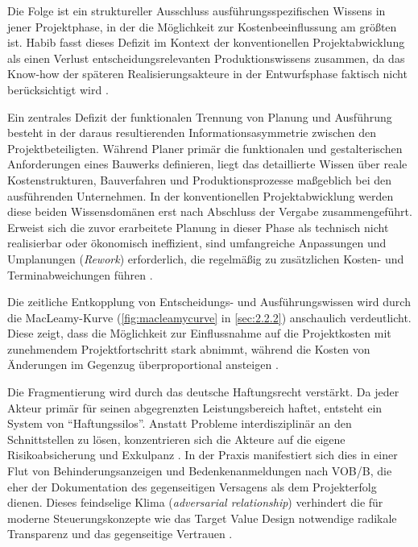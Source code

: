 Die Folge ist ein struktureller Ausschluss ausführungsspezifischen Wissens in jener Projektphase, in der die Möglichkeit zur Kostenbeeinflussung am größten ist. Habib fasst dieses Defizit im Kontext der konventionellen Projektabwicklung als einen Verlust entscheidungsrelevanten Produktionswissens zusammen, da das Know-how der späteren Realisierungsakteure in der Entwurfsphase faktisch nicht berücksichtigt wird \autocite[Vgl.][S.~46 f]{habib_alternative_2020}.

Ein zentrales Defizit der funktionalen Trennung von Planung und Ausführung besteht in der daraus resultierenden Informationsasymmetrie zwischen den Projektbeteiligten. Während Planer primär die funktionalen und gestalterischen Anforderungen eines Bauwerks definieren, liegt das detaillierte Wissen über reale Kostenstrukturen, Bauverfahren und Produktionsprozesse maßgeblich bei den ausführenden Unternehmen. In der konventionellen Projektabwicklung werden diese beiden Wissensdomänen erst nach Abschluss der Vergabe zusammengeführt. Erweist sich die zuvor erarbeitete Planung in dieser Phase als technisch nicht realisierbar oder ökonomisch ineffizient, sind umfangreiche Anpassungen und Umplanungen (\textit{Rework}) erforderlich, die regelmäßig zu zusätzlichen Kosten- und Terminabweichungen führen \autocite[Vgl.][S.~1 ff]{ballard_lean_2003}.  

Die zeitliche Entkopplung von Entscheidungs- und Ausführungswissen wird durch die MacLeamy-Kurve (\cref{fig:macleamycurve} in \cref{sec:2.2.2}) anschaulich verdeutlicht. Diese zeigt, dass die Möglichkeit zur Einflussnahme auf die Projektkosten mit zunehmendem Projektfortschritt stark abnimmt, während die Kosten von Änderungen im Gegenzug überproportional ansteigen \autocite[Vgl.][S.~3 ff]{curt_collaboration_2004}.


Die Fragmentierung wird durch das deutsche Haftungsrecht verstärkt. Da jeder Akteur primär für seinen abgegrenzten Leistungsbereich haftet, entsteht ein System von \enquote{Haftungssilos}. Anstatt Probleme interdisziplinär an den Schnittstellen zu lösen, konzentrieren sich die Akteure auf die eigene Risikoabsicherung und Exkulpanz \autocite[Vgl.][S.~263]{schwab_konfliktkompetenz_2019}. In der Praxis manifestiert sich dies in einer Flut von Behinderungsanzeigen und Bedenkenanmeldungen nach \acs{VOB}/B, die eher der Dokumentation des gegenseitigen Versagens als dem Projekterfolg dienen. Dieses feindselige Klima (\textit{adversarial relationship}) verhindert die für moderne Steuerungskonzepte wie das Target Value Design notwendige radikale Transparenz und das gegenseitige Vertrauen \autocite[Vgl.][S.~7 f]{latham_constructing_1994}.

